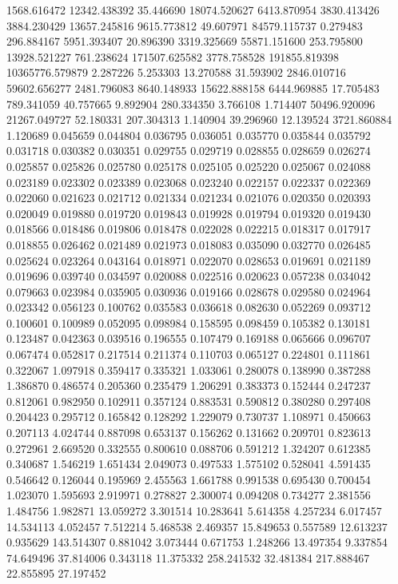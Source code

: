 1568.616472
12342.438392
35.446690
18074.520627
6413.870954
3830.413426
3884.230429
13657.245816
9615.773812
49.607971
84579.115737
0.279483
296.884167
5951.393407
20.896390
3319.325669
55871.151600
253.795800
13928.521227
761.238624
171507.625582
3778.758528
191855.819398
10365776.579879
2.287226
5.253303
13.270588
31.593902
2846.010716
59602.656277
2481.796083
8640.148933
15622.888158
6444.969885
17.705483
789.341059
40.757665
9.892904
280.334350
3.766108
1.714407
50496.920096
21267.049727
52.180331
207.304313
1.140904
39.296960
12.139524
3721.860884
1.120689
0.045659
0.044804
0.036795
0.036051
0.035770
0.035844
0.035792
0.031718
0.030382
0.030351
0.029755
0.029719
0.028855
0.028659
0.026274
0.025857
0.025826
0.025780
0.025178
0.025105
0.025220
0.025067
0.024088
0.023189
0.023302
0.023389
0.023068
0.023240
0.022157
0.022337
0.022369
0.022060
0.021623
0.021712
0.021334
0.021234
0.021076
0.020350
0.020393
0.020049
0.019880
0.019720
0.019843
0.019928
0.019794
0.019320
0.019430
0.018566
0.018486
0.019806
0.018478
0.022028
0.022215
0.018317
0.017917
0.018855
0.026462
0.021489
0.021973
0.018083
0.035090
0.032770
0.026485
0.025624
0.023264
0.043164
0.018971
0.022070
0.028653
0.019691
0.021189
0.019696
0.039740
0.034597
0.020088
0.022516
0.020623
0.057238
0.034042
0.079663
0.023984
0.035905
0.030936
0.019166
0.028678
0.029580
0.024964
0.023342
0.056123
0.100762
0.035583
0.036618
0.082630
0.052269
0.093712
0.100601
0.100989
0.052095
0.098984
0.158595
0.098459
0.105382
0.130181
0.123487
0.042363
0.039516
0.196555
0.107479
0.169188
0.065666
0.096707
0.067474
0.052817
0.217514
0.211374
0.110703
0.065127
0.224801
0.111861
0.322067
1.097918
0.359417
0.335321
1.033061
0.280078
0.138990
0.387288
1.386870
0.486574
0.205360
0.235479
1.206291
0.383373
0.152444
0.247237
0.812061
0.982950
0.102911
0.357124
0.883531
0.590812
0.380280
0.297408
0.204423
0.295712
0.165842
0.128292
1.229079
0.730737
1.108971
0.450663
0.207113
4.024744
0.887098
0.653137
0.156262
0.131662
0.209701
0.823613
0.272961
2.669520
0.332555
0.800610
0.088706
0.591212
1.324207
0.612385
0.340687
1.546219
1.651434
2.049073
0.497533
1.575102
0.528041
4.591435
0.546642
0.126044
0.195969
2.455563
1.661788
0.991538
0.695430
0.700454
1.023070
1.595693
2.919971
0.278827
2.300074
0.094208
0.734277
2.381556
1.484756
1.982871
13.059272
3.301514
10.283641
5.614358
4.257234
6.017457
14.534113
4.052457
7.512214
5.468538
2.469357
15.849653
0.557589
12.613237
0.935629
143.514307
0.881042
3.073444
0.671753
1.248266
13.497354
9.337854
74.649496
37.814006
0.343118
11.375332
258.241532
32.481384
217.888467
22.855895
27.197452
